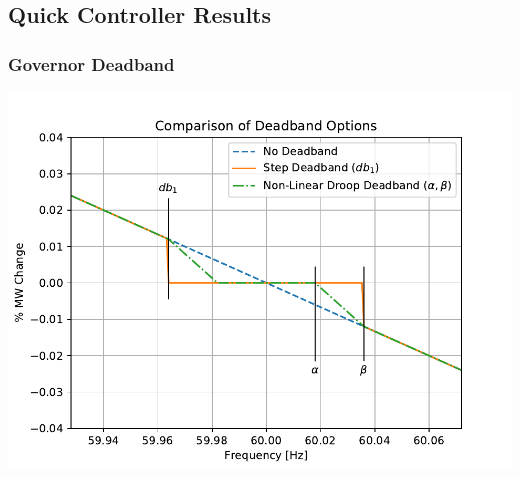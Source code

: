 \documentclass[14pt, unknownkeysallowed]{beamer}
\begin{document}
\subsection{Quick Controller Results}
\begin{frame}
\frametitle{Governor Deadband}
\begin{center}
\includegraphics[height=.85\textheight]{dbAction2}
\end{center}

\end{frame}
\end{document}
